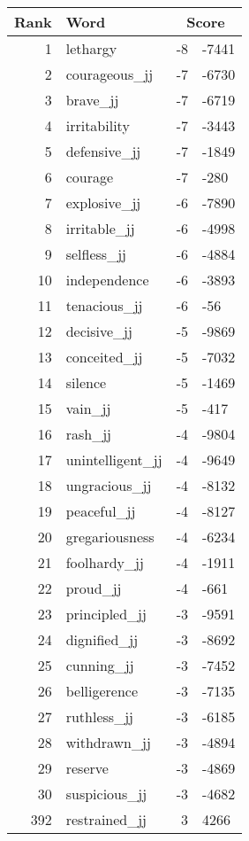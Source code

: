 \begin{longtable}[!htbp]{| rlr@{.}l |}
    \hline
    \textbf{Rank} & \textbf{Word} & \multicolumn{2}{c|}{\textbf{Score}} \\
    \hline
    \endhead
    1 & lethargy & -8 & -7441 \\
    2 & courageous\_jj & -7 & -6730 \\
    3 & brave\_jj & -7 & -6719 \\
    4 & irritability & -7 & -3443 \\
    5 & defensive\_jj & -7 & -1849 \\
    6 & courage & -7 & -280 \\
    7 & explosive\_jj & -6 & -7890 \\
    8 & irritable\_jj & -6 & -4998 \\
    9 & selfless\_jj & -6 & -4884 \\
    10 & independence & -6 & -3893 \\
    11 & tenacious\_jj & -6 & -56 \\
    12 & decisive\_jj & -5 & -9869 \\
    13 & conceited\_jj & -5 & -7032 \\
    14 & silence & -5 & -1469 \\
    15 & vain\_jj & -5 & -417 \\
    16 & rash\_jj & -4 & -9804 \\
    17 & unintelligent\_jj & -4 & -9649 \\
    18 & ungracious\_jj & -4 & -8132 \\
    19 & peaceful\_jj & -4 & -8127 \\
    20 & gregariousness & -4 & -6234 \\
    21 & foolhardy\_jj & -4 & -1911 \\
    22 & proud\_jj & -4 & -661 \\
    23 & principled\_jj & -3 & -9591 \\
    24 & dignified\_jj & -3 & -8692 \\
    25 & cunning\_jj & -3 & -7452 \\
    26 & belligerence & -3 & -7135 \\
    27 & ruthless\_jj & -3 & -6185 \\
    28 & withdrawn\_jj & -3 & -4894 \\
    29 & reserve & -3 & -4869 \\
    30 & suspicious\_jj & -3 & -4682 \\
    392 & restrained\_jj & 3 & 4266 \\

\end{longtable}
